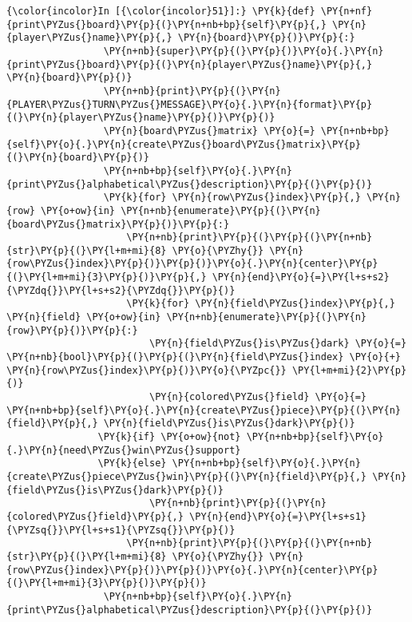     \begin{Verbatim}[commandchars=\\\{\}]
{\color{incolor}In [{\color{incolor}51}]:} \PY{k}{def} \PY{n+nf}{print\PYZus{}board}\PY{p}{(}\PY{n+nb+bp}{self}\PY{p}{,} \PY{n}{player\PYZus{}name}\PY{p}{,} \PY{n}{board}\PY{p}{)}\PY{p}{:}
                 \PY{n+nb}{super}\PY{p}{(}\PY{p}{)}\PY{o}{.}\PY{n}{print\PYZus{}board}\PY{p}{(}\PY{n}{player\PYZus{}name}\PY{p}{,} \PY{n}{board}\PY{p}{)}
                 \PY{n+nb}{print}\PY{p}{(}\PY{n}{PLAYER\PYZus{}TURN\PYZus{}MESSAGE}\PY{o}{.}\PY{n}{format}\PY{p}{(}\PY{n}{player\PYZus{}name}\PY{p}{)}\PY{p}{)}
                 \PY{n}{board\PYZus{}matrix} \PY{o}{=} \PY{n+nb+bp}{self}\PY{o}{.}\PY{n}{create\PYZus{}board\PYZus{}matrix}\PY{p}{(}\PY{n}{board}\PY{p}{)}
                 \PY{n+nb+bp}{self}\PY{o}{.}\PY{n}{print\PYZus{}alphabetical\PYZus{}description}\PY{p}{(}\PY{p}{)}
                 \PY{k}{for} \PY{n}{row\PYZus{}index}\PY{p}{,} \PY{n}{row} \PY{o+ow}{in} \PY{n+nb}{enumerate}\PY{p}{(}\PY{n}{board\PYZus{}matrix}\PY{p}{)}\PY{p}{:}
                     \PY{n+nb}{print}\PY{p}{(}\PY{p}{(}\PY{n+nb}{str}\PY{p}{(}\PY{l+m+mi}{8} \PY{o}{\PYZhy{}} \PY{n}{row\PYZus{}index}\PY{p}{)}\PY{p}{)}\PY{o}{.}\PY{n}{center}\PY{p}{(}\PY{l+m+mi}{3}\PY{p}{)}\PY{p}{,} \PY{n}{end}\PY{o}{=}\PY{l+s+s2}{\PYZdq{}}\PY{l+s+s2}{\PYZdq{}}\PY{p}{)}
                     \PY{k}{for} \PY{n}{field\PYZus{}index}\PY{p}{,} \PY{n}{field} \PY{o+ow}{in} \PY{n+nb}{enumerate}\PY{p}{(}\PY{n}{row}\PY{p}{)}\PY{p}{:}
                         \PY{n}{field\PYZus{}is\PYZus{}dark} \PY{o}{=} \PY{n+nb}{bool}\PY{p}{(}\PY{p}{(}\PY{n}{field\PYZus{}index} \PY{o}{+} \PY{n}{row\PYZus{}index}\PY{p}{)}\PY{o}{\PYZpc{}} \PY{l+m+mi}{2}\PY{p}{)}
                         \PY{n}{colored\PYZus{}field} \PY{o}{=} \PY{n+nb+bp}{self}\PY{o}{.}\PY{n}{create\PYZus{}piece}\PY{p}{(}\PY{n}{field}\PY{p}{,} \PY{n}{field\PYZus{}is\PYZus{}dark}\PY{p}{)} 
				\PY{k}{if} \PY{o+ow}{not} \PY{n+nb+bp}{self}\PY{o}{.}\PY{n}{need\PYZus{}win\PYZus{}support} 
				\PY{k}{else} \PY{n+nb+bp}{self}\PY{o}{.}\PY{n}{create\PYZus{}piece\PYZus{}win}\PY{p}{(}\PY{n}{field}\PY{p}{,} \PY{n}{field\PYZus{}is\PYZus{}dark}\PY{p}{)}
                         \PY{n+nb}{print}\PY{p}{(}\PY{n}{colored\PYZus{}field}\PY{p}{,} \PY{n}{end}\PY{o}{=}\PY{l+s+s1}{\PYZsq{}}\PY{l+s+s1}{\PYZsq{}}\PY{p}{)}
                     \PY{n+nb}{print}\PY{p}{(}\PY{p}{(}\PY{n+nb}{str}\PY{p}{(}\PY{l+m+mi}{8} \PY{o}{\PYZhy{}} \PY{n}{row\PYZus{}index}\PY{p}{)}\PY{p}{)}\PY{o}{.}\PY{n}{center}\PY{p}{(}\PY{l+m+mi}{3}\PY{p}{)}\PY{p}{)}
                 \PY{n+nb+bp}{self}\PY{o}{.}\PY{n}{print\PYZus{}alphabetical\PYZus{}description}\PY{p}{(}\PY{p}{)}
\end{Verbatim}


